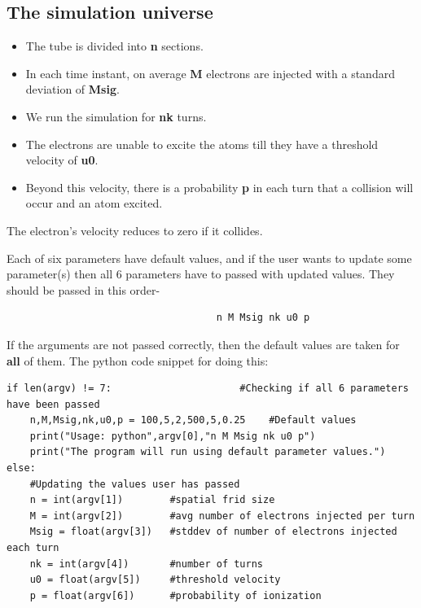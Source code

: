 \documentclass[11pt, a4paper]{article}
\begin{document}
\subsection{The simulation universe}
    \begin{itemize}
        \item The tube is divided into \textbf{n} sections.
        \item In each time instant, on average \textbf{M} electrons are injected with a standard deviation of \textbf{Msig}.
        \item We run the simulation for \textbf{nk} turns. 
        \item The electrons are unable to excite the atoms till they have a threshold velocity of \textbf{u0}.
        \item  Beyond this velocity, there is a probability \textbf{p} in each turn that a collision will occur and an atom excited.
    \end{itemize}
    The electron’s velocity reduces to zero if it collides.
    
    Each of six parameters have default values, and if the user wants to update some parameter(s) then all 6 parameters have to passed with updated values. They should be passed in this order-
    \begin{verbatim}
                                    n M Msig nk u0 p
    \end{verbatim}
     If the arguments are not passed correctly, then the default values are taken for \textbf{all} of them. The python code snippet for doing this:
    \begin{verbatim}
if len(argv) != 7:                      #Checking if all 6 parameters have been passed
    n,M,Msig,nk,u0,p = 100,5,2,500,5,0.25    #Default values
    print("Usage: python",argv[0],"n M Msig nk u0 p")
    print("The program will run using default parameter values.")
else:
    #Updating the values user has passed
    n = int(argv[1])        #spatial frid size             
    M = int(argv[2])        #avg number of electrons injected per turn
    Msig = float(argv[3])   #stddev of number of electrons injected each turn
    nk = int(argv[4])       #number of turns
    u0 = float(argv[5])     #threshold velocity
    p = float(argv[6])      #probability of ionization
    \end{verbatim}
\end{document}
